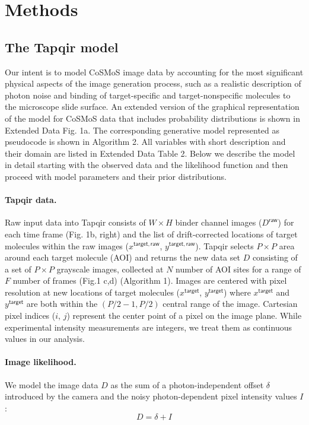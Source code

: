 \section*{Methods}

\subsection*{The Tapqir model} 

Our intent is to model CoSMoS image data by accounting for the most significant physical aspects of the image generation process, such as a realistic description of photon noise and binding of target-specific and target-nonspecific molecules to the microscope slide surface. An extended version of the graphical representation of the model for CoSMoS data that includes probability distributions is shown in Extended Data Fig. 1a. The corresponding generative model represented as pseudocode is shown in Algorithm 2. All variables with short description and their domain are listed in Extended Data Table 2. Below we describe the model in detail starting with the observed data and the likelihood function and then proceed with model parameters and their prior distributions.

\paragraph{Tapqir data.} Raw input data into Tapqir consists of $W \times H$ binder channel images ($D^\mathsf{raw}$) for each time frame (Fig. 1b, right) and the list of drift-corrected locations of target molecules within the raw images ($x^{\mathsf{target}, \mathsf{raw}}$, $y^{\mathsf{target}, \mathsf{raw}}$). Tapqir selects $P \times P$ area around each target molecule (AOI) and returns the new data set $D$ consisting of a set of $P \times P$ grayscale images, collected at $N$ number of AOI sites for a range of $F$ number of frames (Fig.1 c,d) (Algorithm 1). Images are centered with pixel resolution at new locations of target molecules ($x^\mathsf{target}$, $y^\mathsf{target}$) where $x^\mathsf{target}$ and $y^\mathsf{target}$ are both within the $(P/2-1,P/2)$ central range of the image. Cartesian pixel indices ($i$, $j$) represent the center point of a pixel on the image plane. While experimental intensity measurements are integers, we treat them as continuous values in our analysis.



\paragraph{Image likelihood.} We model the image data $D$ as the sum of a photon-independent offset $\delta$ introduced by the camera and the noisy photon-dependent pixel intensity values $I$:
%
\begin{equation}
    D = \delta + I
\end{equation}

